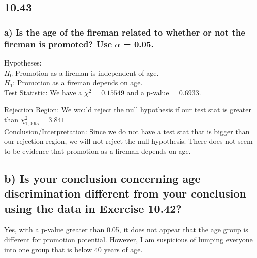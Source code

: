 \documentclass{article}
\begin{document}
\subsection*{10.43}
\subsubsection*{a) Is the age of the fireman related to whether or not the fireman is promoted?  Use $\alpha$ = 0.05.}
Hypotheses: \\
$H_{0}$ Promotion as a fireman is independent of age.  \\ 
$H_{1}$: Promotion as a fireman depends on age.  \\

Test Statistic:
We have a $\chi^{2} = 0.15549$ and a p-value = 0.6933.

Rejection Region:
We would reject the null hypothesis if our test stat is greater than $\chi_{1, 0.95}^{2} = 3.841$ \\

Conclusion/Interpretation:
Since we do not have a test stat that is bigger than our rejection region, we will not reject the null hypothesis.  There does not seem to be evidence that promotion as a fireman depends on age.  

\subsection*{b) Is your conclusion concerning age discrimination different from your conclusion using the data in Exercise 10.42?}
Yes, with a p-value greater than 0.05, it does not appear that the age group is different for promotion potential.  However, I am suspicious of lumping everyone into one group that is below 40 years of age.



\end{document}
